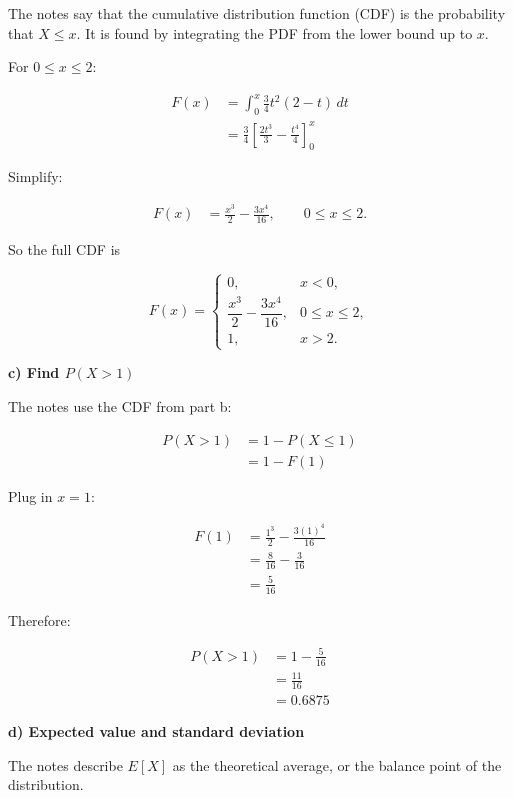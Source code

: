 \documentclass[10pt]{article}
\begin{document}
The notes say that the cumulative distribution function
(CDF) is the probability that $X\leq x$.
It is found by integrating the PDF from the lower bound up
to $x$.

For $0\leq x\leq 2$:

\begin{align*}
F(x)
&=
\int_0^x
\frac{3}{4}t^2(2-t)\,dt \\[2mm]
&=
\frac{3}{4}
\left[
\frac{2t^3}{3}
-\frac{t^4}{4}
\right]_0^x
\end{align*}

Simplify:

\begin{align*}
F(x)
&=
\frac{x^3}{2}
-\frac{3x^4}{16},
\qquad 0\leq x\leq 2.
\end{align*}

So the full CDF is

\[
F(x)=
\begin{cases}
0,
& x<0,\\
\dfrac{x^3}{2}
-\dfrac{3x^4}{16},
& 0\leq x\leq 2,\\
1,
& x>2.
\end{cases}
\]

\RepeatedQuestion{\uppgiftTwoQuestion}
\textbf{c) Find $P(X>1)$}

The notes use the CDF from part b:

\begin{align*}
P(X>1)
&=1-P(X\leq 1) \\[2mm]
&=1-F(1)
\end{align*}

Plug in $x=1$:

\begin{align*}
F(1)
&=
\frac{1^3}{2}
-\frac{3(1)^4}{16} \\[2mm]
&=
\frac{8}{16}
-\frac{3}{16} \\[2mm]
&=
\frac{5}{16}
\end{align*}

Therefore:

\begin{align*}
P(X>1)
&=1-\frac{5}{16} \\[2mm]
&=\frac{11}{16} \\[2mm]
&=0.6875
\end{align*}

\RepeatedQuestion{\uppgiftTwoQuestion}
\textbf{d) Expected value and standard deviation}

The notes describe $E[X]$ as the theoretical average,
or the balance point of the distribution.
\end{document}

